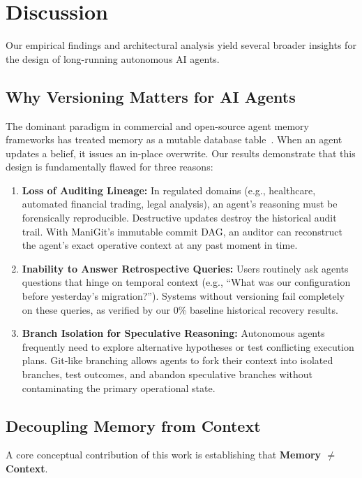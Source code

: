 \section{Discussion}
\label{sec:discussion}

Our empirical findings and architectural analysis yield several broader insights for the design of long-running autonomous AI agents.

\subsection{Why Versioning Matters for AI Agents}
The dominant paradigm in commercial and open-source agent memory frameworks has treated memory as a mutable database table~\cite{packer2023memgpt,deshmukh2024mem0}. When an agent updates a belief, it issues an in-place overwrite. Our results demonstrate that this design is fundamentally flawed for three reasons:
\begin{enumerate}
    \item \textbf{Loss of Auditing Lineage:} In regulated domains (e.g., healthcare, automated financial trading, legal analysis), an agent's reasoning must be forensically reproducible. Destructive updates destroy the historical audit trail. With ManiGit's immutable commit DAG, an auditor can reconstruct the agent's exact operative context at any past moment in time.
    \item \textbf{Inability to Answer Retrospective Queries:} Users routinely ask agents questions that hinge on temporal context (e.g., ``What was our configuration before yesterday's migration?''). Systems without versioning fail completely on these queries, as verified by our 0\% baseline historical recovery results.
    \item \textbf{Branch Isolation for Speculative Reasoning:} Autonomous agents frequently need to explore alternative hypotheses or test conflicting execution plans. Git-like branching allows agents to fork their context into isolated branches, test outcomes, and abandon speculative branches without contaminating the primary operational state.
\end{enumerate}

\subsection{Decoupling Memory from Context}
A core conceptual contribution of this work is establishing that \textbf{Memory $\ne$ Context}. 

